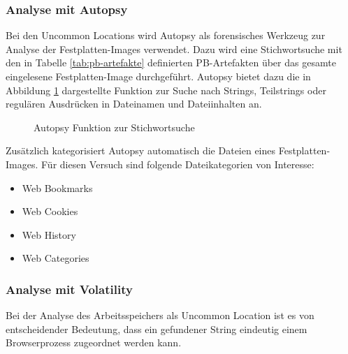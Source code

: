 \subsubsection*{Analyse mit Autopsy}
\label{subsubsection:methodik-datenanalyse-uncommonlocations-analysemitautopsy}
Bei den Uncommon Locations wird Autopsy als forensisches Werkzeug zur Analyse der Festplatten-Images verwendet.
Dazu wird eine Stichwortsuche mit den in Tabelle \ref{tab:pb-artefakte} definierten PB-Artefakten über das gesamte eingelesene Festplatten-Image durchgeführt.
Autopsy bietet dazu die in Abbildung \ref{img:autopsy-keywordsuche} dargestellte Funktion zur Suche nach Strings, Teilstrings oder regulären Ausdrücken in Dateinamen und Dateiinhalten an.
\begin{figure}[h!]
	\centerline{}
	\caption{Autopsy Funktion zur Stichwortsuche}
	\label{img:autopsy-keywordsuche}
\end{figure}

Zusätzlich kategorisiert Autopsy automatisch die Dateien eines Festplatten-Images. Für diesen Versuch sind folgende Dateikategorien von Interesse:
\begin{itemize}
\item Web Bookmarks
\item Web Cookies
\item Web History
\item Web Categories
\end{itemize}

\subsubsection*{Analyse mit Volatility}
\label{subsubsection:methodik-datenanalyse-uncommonlocations-analysemitvolatility}
Bei der Analyse des Arbeitsspeichers als Uncommon Location ist es von entscheidender Bedeutung, dass ein gefundener String eindeutig einem Browserprozess zugeordnet werden kann. 

